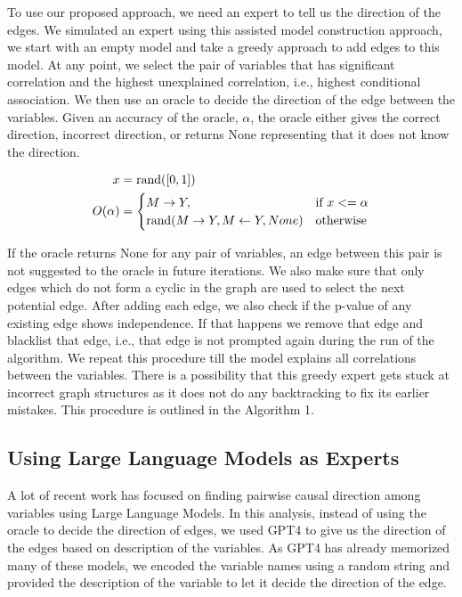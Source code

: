 \documentclass[letterpaper]{article} %
\begin{document}
To use our proposed approach, we need an expert to tell us the direction of the
edges. We simulated an expert using this assisted model construction approach,
we start with an empty model and take a greedy approach to add edges to this
model. At any point, we select the pair of variables that has significant
correlation and the highest unexplained correlation, i.e., highest conditional
association. We then use an oracle to decide the direction of the edge between
the variables. Given an accuracy of the oracle, $ \alpha $, the oracle either
gives the correct direction, incorrect direction, or returns None representing
that it does not know the direction.

\begin{equation}
	\begin{split}
		x &= \textnormal{rand}([0, 1]) \\
		O(\alpha) &= \begin{cases} 
			M \rightarrow Y, & \textnormal{if  } x <= \alpha \\
			\textnormal{rand}(M \rightarrow Y, M \leftarrow Y, None) & \textnormal{otherwise} \\
				\end{cases} \\
	\end{split}
\end{equation}

If the oracle returns None for any pair of variables, an edge between this pair
is not suggested to the oracle in future iterations. We also make sure that
only edges which do not form a cyclic in the graph are used to select the next
potential edge. After adding each edge, we also check if the p-value of any
existing edge shows independence. If that happens we remove that edge and
blacklist that edge, i.e., that edge is not prompted again during the run of
the algorithm. We repeat this procedure till the model explains all
correlations between the variables. There is a possibility that this greedy
expert gets stuck at incorrect graph structures as it does not do any
backtracking to fix its earlier mistakes. This procedure is outlined in the
Algorithm 1.

\subsection{Using Large Language Models as Experts}
A lot of recent work has focused on finding pairwise causal direction among
variables using Large Language Models. In this analysis, instead of using the
oracle to decide the direction of edges, we used GPT4 to give us the direction
of the edges based on description of the variables. As GPT4 has already
memorized many of these models, we encoded the variable names using a random
string and provided the description of the variable to let it decide the
direction of the edge.
\end{document}
